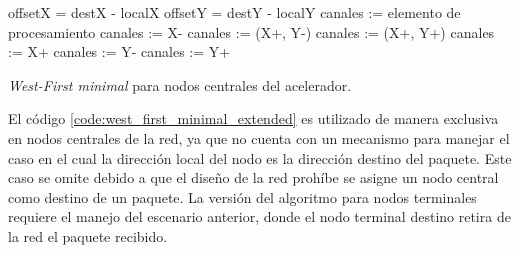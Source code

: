 \begin{algorithm}[]
		\Begin
			{
			offsetX = destX - localX\;
			offsetY = destY - localY\;
					{
						canales := elemento de procesamiento\;
					}
					{
						canales := X-\;
					}
					{
						canales := (X+, Y-)\;
					}
					{
						canales := (X+, Y+)\;
					}
					{
						canales := X+\;
					}
					{
						canales := Y-\;
					}
					{
						canales := Y+\;
					}
		}
	\caption
		{
			\textit{West-First minimal} para nodos centrales del acelerador.
		}	
	\label{code:west_first_minimal_extended}
\end{algorithm}

El código \ref{code:west_first_minimal_extended} es utilizado de manera exclusiva en nodos centrales de la red, ya que no cuenta con un mecanismo para manejar el caso en el cual la dirección local del nodo es la dirección destino del paquete. Este caso se omite debido a que el diseño de la red prohíbe se asigne un nodo central como destino de un paquete. La versión del algoritmo para nodos terminales requiere el manejo del escenario anterior, donde el nodo terminal destino retira de la red el paquete recibido.

